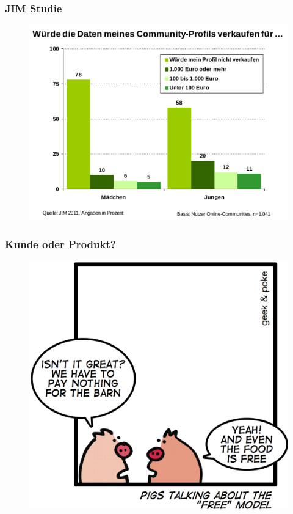 \documentclass[12pt]{beamer}
\begin{document}
\begin{frame}
  \frametitle{JIM Studie}
  \begin{figure}
    \includegraphics[height=0.7\textheight]{img/jim_verkaufen.png}
  \end{figure}
\end{frame}

\begin{frame}
  \frametitle{Kunde oder Produkt?}
  \begin{figure}
    \includegraphics[height=0.7\textheight]{img/business_pigs.jpg}
  \end{figure}
\end{frame}
\end{document}
